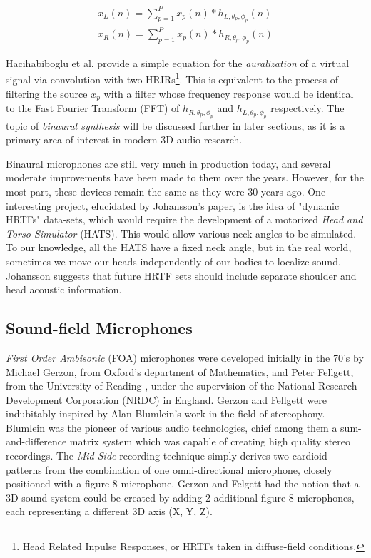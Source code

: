\begin{equation} \label{eq:conv-hrir}
\begin{array}{l}
x_{L}(n)=\sum_{p=1}^{P} x_{p}(n) * h_{L, \theta_{p}, \phi_{p}}(n) \\
x_{R}(n)=\sum_{p=1}^{P} x_{p}(n) * h_{R, \theta_{p}, \phi_{p}}(n)
\end{array}
\end{equation}

Hacihabiboglu et al. \cite{hacihabiboglu2017perceptual} provide a simple equation for the \textit{auralization} of a virtual signal via convolution with two HRIRs\footnote{Head Related Inpulse Responses, or HRTFs taken in diffuse-field conditions.}. This is equivalent to the process of filtering the source $x_p$ with a filter whose frequency response would be identical to the Fast Fourier Transform (FFT) of $h_{R, \theta_{p}, \phi_{p}}$ and $h_{L, \theta_{p}, \phi_{p}}$ respectively. The topic of \textit{binaural synthesis} will be discussed further in later sections, as it is a primary area of interest in modern 3D audio research.

Binaural microphones are still very much in production today, and several moderate improvements have been made to them over the years. However, for the most part, these devices remain the same as they were 30 years ago. One interesting project, elucidated by Johansson's \cite{johansson2019vr} paper, is the idea of "dynamic HRTFs" data-sets, which would require the development of a motorized \textit{Head and Torso Simulator} (HATS). This would allow various neck angles to be simulated. To our knowledge, all the HATS have a fixed neck angle, but in the real world, sometimes we move our heads independently of our bodies to localize sound. Johansson suggests that future HRTF sets should include separate shoulder and head acoustic information.

\subsection{Sound-field Microphones} \label{subsec:sf-mics}

\textit{First Order Ambisonic} (FOA) microphones were developed initially in the 70's by Michael Gerzon, from Oxford's department of Mathematics, and Peter Fellgett, from the University of Reading \cite{elen1991whatever}, under the supervision of the National Research Development Corporation (NRDC) in England. Gerzon and Fellgett were indubitably inspired by Alan Blumlein's work in the field of stereophony. Blumlein was the pioneer of various audio technologies, chief among them a sum-and-difference matrix system which was capable of creating high quality stereo recordings. The \textit{Mid-Side} recording technique simply derives two cardioid patterns from the combination of one omni-directional microphone, closely positioned with a figure-8 microphone. Gerzon and Felgett had the notion that a 3D sound system could be created by adding 2 additional figure-8 microphones, each representing a different 3D axis (X, Y, Z). 

